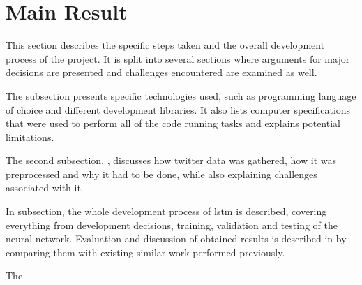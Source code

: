 \section{Main Result}
    This section describes the specific steps taken and the overall development process of the project. It is split into several sections where arguments for major decisions are presented and challenges encountered are examined as well.
    
    The  subsection presents specific technologies used, such as programming language of choice and different development libraries. It also lists computer specifications that were used to perform all of the code running tasks and explains potential limitations.
    
    The second subsection, , discusses how twitter data was gathered, how it was preprocessed and why it had to be done, while also explaining challenges associated with it.
    
    In  subsection, the whole development process of \gls{lstm} is described, covering everything from development decisions, training, validation and testing of the neural network. Evaluation and discussion of obtained results is described in  by comparing them with existing similar work performed previously. 
    
    The 


